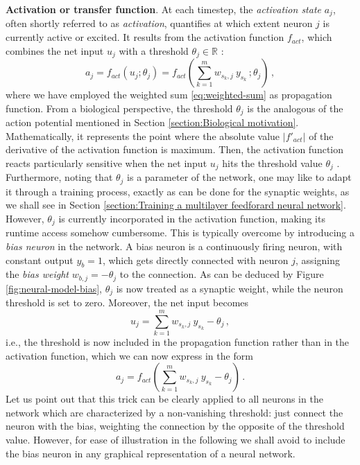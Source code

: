 \documentclass[12pt, a4paper, twoside, openright]{report}
\numberwithin{equation}{chapter}
\theoremstyle{theorem}
\theoremstyle{definition}
\theoremstyle{remark}
\theoremstyle{proposition}
\numberwithin{figure}{chapter}
\begin{document}
		\vspace*{0.3cm}
		
		\noindent \textbf{Activation or transfer function}. At each timestep, the \emph{activation state} $a_j$, often shortly referred to as \emph{activation}, quantifies at which extent neuron $j$ is currently active or excited. It results from the activation function $f_{act}$, which combines the net input $u_j$ with a threshold $\theta_j \in \mathbb{R}$ \cite{Kri}: 
		\begin{equation}
			\label{eq:activation-function}
			a_j = f_{act}(u_j; \theta_j) = f_{act}(\sum_{k = 1}^m w_{s_k,j} ~ y_{s_k} \, ; \theta_j) \, ,
		\end{equation}
		where we have employed the weighted sum \eqref{eq:weighted-sum} as propagation function. From a biological perspective, the threshold $\theta_j$ is the analogous of the action potential mentioned in Section \ref{section:Biological motivation}. Mathematically, it represents the point where the absolute value $|f'_{act}|$ of the derivative of the activation function is maximum. Then, the activation function reacts particularly sensitive when the net input $u_j$ hits the threshold value $\theta_j$ \cite{Kri}. \\
		Furthermore, noting that $\theta_j$ is a parameter of the network, one may like to adapt it through a training process, exactly as can be done for the synaptic weights, as we shall see in Section \ref{section:Training a multilayer feedforard neural network}. However, $\theta_j$ is currently incorporated in the activation function, making its runtime access somehow cumbersome. This is typically overcome by introducing a \emph{bias neuron} in the network. A bias neuron is a continuously firing neuron, with constant output $y_{b} = 1$, which gets directly connected with neuron $j$, assigning the \emph{bias weight} $w_{b,j} = - \theta_j$ to the connection. As can be deduced by Figure \ref{fig:neural-model-bias}, $\theta_j$ is now treated as a synaptic weight, while the neuron threshold is set to zero. Moreover, the net input becomes
		\begin{equation}
			\label{eq:net-input}
			u_j = \sum_{k = 1}^m w_{s_k,j} ~ y_{s_k} - \theta_j \, ,
		\end{equation}
		i.e., the threshold is now included in the propagation function rather than in the activation function, which we can now express in the form
		\begin{equation}
			a_j = f_{act}(\sum_{k = 1}^m w_{s_k,j} ~ y_{s_k} - \theta_j) \, .
		\end{equation}
		Let us point out that this trick can be clearly applied to all neurons in the network which are characterized by a non-vanishing threshold: just connect the neuron with the bias, weighting the connection by the opposite of the threshold value. However, for ease of illustration in the following we shall avoid to include the bias neuron in any graphical representation of a neural network.
		
\end{document}
